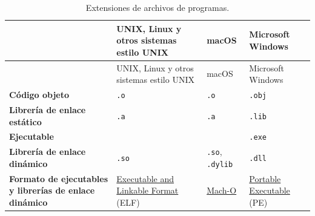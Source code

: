 \begin{longtable}[]{@{}
  >{\raggedright\arraybackslash}p{}
  >{\raggedright\arraybackslash}p{}
  >{\raggedright\arraybackslash}p{}
  >{\raggedright\arraybackslash}p{}@{}}
\caption{Extensiones de archivos de programas.}\tabularnewline
\toprule\noalign{}
\begin{minipage}[b]{\linewidth}\raggedright
\end{minipage} & \begin{minipage}[b]{\linewidth}\raggedright
UNIX, Linux y otros sistemas estilo UNIX
\end{minipage} & \begin{minipage}[b]{\linewidth}\raggedright
macOS
\end{minipage} & \begin{minipage}[b]{\linewidth}\raggedright
Microsoft Windows
\end{minipage} \\
\midrule\noalign{}
\endfirsthead
\toprule\noalign{}
\begin{minipage}[b]{\linewidth}\raggedright
\end{minipage} & \begin{minipage}[b]{\linewidth}\raggedright
UNIX, Linux y otros sistemas estilo UNIX
\end{minipage} & \begin{minipage}[b]{\linewidth}\raggedright
macOS
\end{minipage} & \begin{minipage}[b]{\linewidth}\raggedright
Microsoft Windows
\end{minipage} \\
\midrule\noalign{}
\endhead
\bottomrule\noalign{}
\endlastfoot
\textbf{Código objeto} & \texttt{.o} & \texttt{.o} & \texttt{.obj} \\
\textbf{Librería de enlace estático} & \texttt{.a} & \texttt{.a} &
\texttt{.lib} \\
\textbf{Ejecutable} & & & \texttt{.exe} \\
\textbf{Librería de enlace dinámico} & \texttt{.so} & \texttt{.so},
\texttt{.dylib} & \texttt{.dll} \\
\textbf{Formato de ejecutables y librerías de enlace dinámico} &
\href{https://es.wikipedia.org/wiki/Executable_and_Linkable_Format}{Executable
and Linkable Format} (ELF) &
\href{https://en.wikipedia.org/wiki/Mach-O}{Mach-O} &
\href{https://es.wikipedia.org/wiki/Portable_Executable}{Portable
Executable} (PE) \\
\end{longtable}

